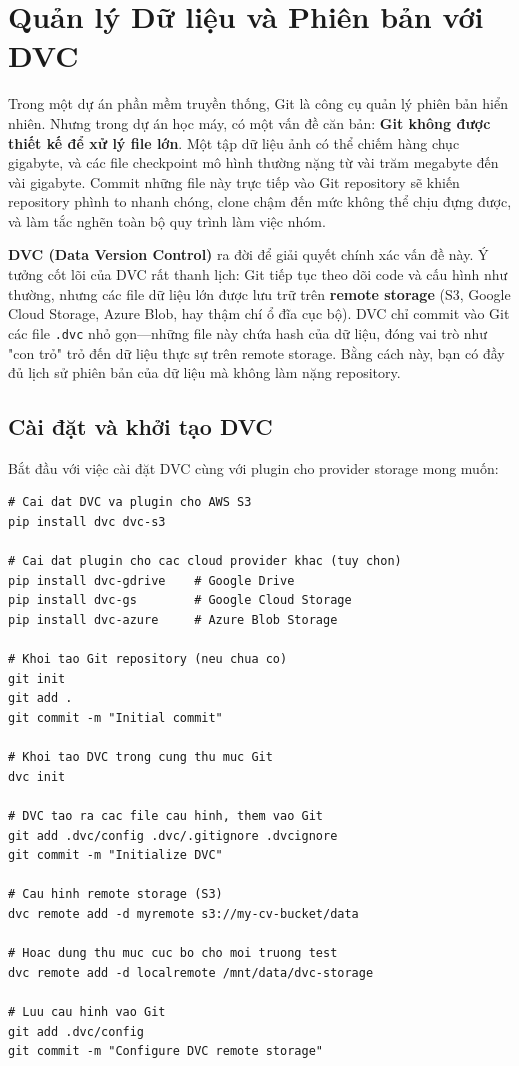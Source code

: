 \section{Quản lý Dữ liệu và Phiên bản với DVC}
\label{sec:dvc}

Trong một dự án phần mềm truyền thống, Git là công cụ quản lý phiên bản hiển nhiên. Nhưng trong dự án học máy, có một vấn đề căn bản: \textbf{Git không được thiết kế để xử lý file lớn}. Một tập dữ liệu ảnh có thể chiếm hàng chục gigabyte, và các file checkpoint mô hình thường nặng từ vài trăm megabyte đến vài gigabyte. Commit những file này trực tiếp vào Git repository sẽ khiến repository phình to nhanh chóng, clone chậm đến mức không thể chịu đựng được, và làm tắc nghẽn toàn bộ quy trình làm việc nhóm.

\textbf{DVC (Data Version Control)} ra đời để giải quyết chính xác vấn đề này. Ý tưởng cốt lõi của DVC rất thanh lịch: Git tiếp tục theo dõi code và cấu hình như thường, nhưng các file dữ liệu lớn được lưu trữ trên \textbf{remote storage} (S3, Google Cloud Storage, Azure Blob, hay thậm chí ổ đĩa cục bộ). DVC chỉ commit vào Git các file \texttt{.dvc} nhỏ gọn---những file này chứa hash của dữ liệu, đóng vai trò như "con trỏ" trỏ đến dữ liệu thực sự trên remote storage. Bằng cách này, bạn có đầy đủ lịch sử phiên bản của dữ liệu mà không làm nặng repository.

\subsection{Cài đặt và khởi tạo DVC}
\label{subsec:dvc_setup}

Bắt đầu với việc cài đặt DVC cùng với plugin cho provider storage mong muốn:

\begin{verbatim}
# Cai dat DVC va plugin cho AWS S3
pip install dvc dvc-s3

# Cai dat plugin cho cac cloud provider khac (tuy chon)
pip install dvc-gdrive    # Google Drive
pip install dvc-gs        # Google Cloud Storage
pip install dvc-azure     # Azure Blob Storage

# Khoi tao Git repository (neu chua co)
git init
git add .
git commit -m "Initial commit"

# Khoi tao DVC trong cung thu muc Git
dvc init

# DVC tao ra cac file cau hinh, them vao Git
git add .dvc/config .dvc/.gitignore .dvcignore
git commit -m "Initialize DVC"

# Cau hinh remote storage (S3)
dvc remote add -d myremote s3://my-cv-bucket/data

# Hoac dung thu muc cuc bo cho moi truong test
dvc remote add -d localremote /mnt/data/dvc-storage

# Luu cau hinh vao Git
git add .dvc/config
git commit -m "Configure DVC remote storage"
\end{verbatim}

